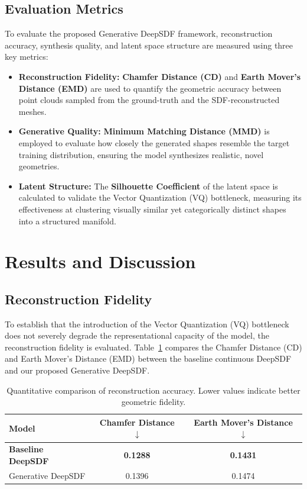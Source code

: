 \documentclass[11pt, a4paper]{article}
\begin{document}
\subsection{Evaluation Metrics}
To evaluate the proposed Generative DeepSDF framework, reconstruction accuracy, synthesis quality, and latent space structure are measured using three key metrics:

\begin{itemize}
    \item \textbf{Reconstruction Fidelity:} \textbf{Chamfer Distance (CD)} and \textbf{Earth Mover’s Distance (EMD)} are used to quantify the geometric accuracy between point clouds sampled from the ground-truth and the SDF-reconstructed meshes.
    \item \textbf{Generative Quality:} \textbf{Minimum Matching Distance (MMD)} is employed to evaluate how closely the generated shapes resemble the target training distribution, ensuring the model synthesizes realistic, novel geometries.
    \item \textbf{Latent Structure:} The \textbf{Silhouette Coefficient} of the latent space is calculated to validate the Vector Quantization (VQ) bottleneck, measuring its effectiveness at clustering visually similar yet categorically distinct shapes into a structured manifold.
\end{itemize}

\section{Results and Discussion}

\subsection{Reconstruction Fidelity}
To establish that the introduction of the Vector Quantization (VQ) bottleneck does not severely degrade the representational capacity of the model, the reconstruction fidelity is evaluated. Table~\ref{tab:reconstruction} compares the Chamfer Distance (CD) and Earth Mover's Distance (EMD) between the baseline continuous DeepSDF and our proposed Generative DeepSDF. 

\begin{table}[htbp]
    \centering
    \caption{Quantitative comparison of reconstruction accuracy. Lower values indicate better geometric fidelity.}
    \begin{tabular}{lcc}
        \hline
        \textbf{Model} & \textbf{Chamfer Distance $\downarrow$} & \textbf{Earth Mover's Distance $\downarrow$} \\
        \hline
        \textbf{Baseline DeepSDF }& \textbf{0.1288} & \textbf{0.1431} \\
        Generative DeepSDF & 0.1396 & 0.1474 \\
        \hline
    \end{tabular}
    \label{tab:reconstruction}
\end{table}
\end{document}
